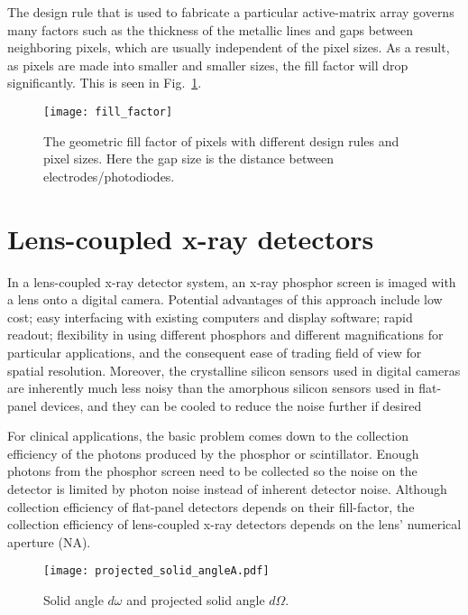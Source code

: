 The design rule that is used to fabricate a particular active-matrix array governs many factors such as the thickness of the metallic lines and gaps between neighboring pixels, which are usually independent of the pixel sizes.  As a result, as pixels are made into smaller and smaller sizes, the fill factor will drop significantly.  This is seen in Fig.~\ref{fig:fill_factor}.

\begin{figure}[ht]
\texttt{[image: fill\_factor]}
\caption[The geometric fill factor of pixels with different design rules and pixel sizes.  Here the gap size is the distance between electrodes/photodiodes.]{The geometric fill factor of pixels with different design rules and pixel sizes.  Here the gap size is the distance between electrodes/photodiodes.}
\label{fig:fill_factor}
\end{figure}


\section{Lens-coupled x-ray detectors}
In a lens-coupled x-ray detector system, an x-ray phosphor screen is imaged with a lens onto a digital camera.  Potential advantages of this approach include low cost; easy interfacing with existing computers and display software; rapid readout; flexibility in using different phosphors and different magnifications for particular applications, and the consequent ease of trading field of view for spatial resolution.  Moreover, the crystalline silicon sensors used in digital cameras are inherently much less noisy than the amorphous silicon sensors used in flat-panel devices, and they can be cooled to reduce the noise further if desired

For clinical applications, the basic problem comes down to the collection efficiency of the photons produced by the phosphor or scintillator.  Enough photons from the phosphor screen need to be collected so the noise on the detector is limited by photon noise instead of inherent detector noise.  Although collection efficiency of flat-panel detectors depends on their fill-factor, the collection efficiency of lens-coupled x-ray detectors depends on the lens' numerical aperture (NA).

\begin{figure}
	\centering
	\texttt{[image: projected\_solid\_angleA.pdf]}
	\caption{Solid angle $d\omega$ and projected solid angle $d\Omega$.}
	\label{fig:solid_angle}
\end{figure}

